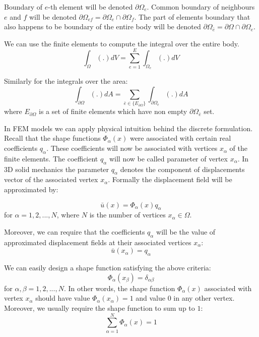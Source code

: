 \documentclass[en]{minipw} %
\begin{document}
Boundary of $e$-th element will be denoted $\partial \Omega_{e}$. Common boundary of neighbours $e$ and $f$ will be denoted $\partial \Omega_{ef} = \partial \Omega_e \cap \partial \Omega_f$. The part of elements boundary that also happens to be boundary of the entire body will be denoted $\partial \Omega_{\bar{e}} = \partial \Omega \cap \partial \Omega_{e}$.

We can use the finite elements to compute the integral over the entire body.
\begin{equation}
\int_{\Omega} (.) dV = \sum^{E}_{e=1} \int_{\Omega_{e}}(.) dV
\end{equation}

Similarly for the integrals over the area:
\begin{equation}
\int_{\partial \Omega} (.) dA = \sum_{\bar{e} \in \{ E_{\partial \Omega} \}} \int_{\partial \Omega_{\bar{e}}}(.) dA
\end{equation}
where $E_{\partial \Omega}$ is a set of finite elements which have non empty $\partial \Omega_{\bar{e}}$ set.

In FEM models we can apply physical intuition behind the discrete formulation. Recall that the shape functions $\Phi_{\alpha}(x)$ were associated with certain real coefficients $q_{\alpha}$. These coefficients will now be associated with vertices $x_{\alpha}$ of the finite elements. The coefficient $q_{\alpha}$ will now be called parameter of vertex $x_{\alpha}$. In 3D solid mechanics the parameter  $q_{\alpha}$ denotes the component of displacements vector of the associated vertex $x_{\alpha}$. Formally the displacement field will be approximated by:

\begin{equation}
\bar{u}(x) = \Phi_{\alpha}(x)q_{\alpha}
\end{equation}
for $\alpha = 1,2,...,N$, where $N$ is the number of vertices $x_{\alpha} \in \Omega$.

Moreover, we can require that the coefficients $q_{\alpha}$ will be the value of approximated displacement fields at their associated vertices $x_{\alpha}$:
\begin{equation}
\bar{u}(x_{\alpha}) = q_{\alpha}
\end{equation}

We can easily design a shape function satisfying the above criteria:
\begin{equation}
\Phi_{\alpha}(x_{\beta}) = \delta_{\alpha \beta}
\end{equation}
for $\alpha , \beta = 1,2,...,N$. In other words, the shape function $\Phi_{\alpha}(x)$ associated with vertex $x_{\alpha}$ should have value $\Phi_{\alpha}(x_{\alpha}) = 1$ and value $0$ in any other vertex. 
Moreover, we usually require the shape function to sum up to $1$:
\begin{equation}
\sum^{N}_{\alpha = 1}\Phi_{\alpha}(x) = 1
\end{equation}
\end{document}
